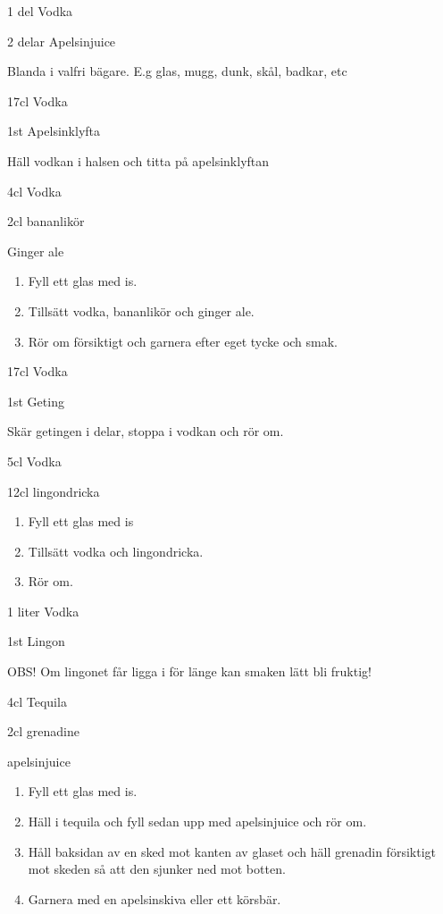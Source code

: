1 del Vodka

2 delar Apelsinjuice

Blanda i valfri bägare. E.g glas, mugg, dunk, skål, badkar, etc
\filbreak
{}

17cl Vodka

1st Apelsinklyfta

Häll vodkan i halsen och titta på apelsinklyftan
\filbreak
{}

4cl Vodka

2cl bananlikör

Ginger ale

\begin{enumerate}
    \item Fyll ett glas med is.
    \item Tillsätt vodka, bananlikör och ginger ale.
    \item Rör om försiktigt och garnera efter eget tycke och smak.
\end{enumerate}
\filbreak
{}

17cl Vodka

1st Geting

Skär getingen i delar, stoppa i vodkan och rör om.
\filbreak
{}

5cl Vodka

12cl lingondricka

\begin{enumerate}
    \item Fyll ett glas med is
    \item Tillsätt vodka och lingondricka.
    \item Rör om.
\end{enumerate}
\filbreak
{}

1 liter Vodka

1st Lingon

OBS! Om lingonet får ligga i för länge kan smaken lätt bli fruktig!
\filbreak
{}

4cl Tequila

2cl grenadine

apelsinjuice

\begin{enumerate}
    \item Fyll ett glas med is.
    \item Häll i tequila och fyll sedan upp med apelsinjuice och rör om.
    \item Håll baksidan av en sked mot kanten av glaset och häll grenadin försiktigt mot skeden så att den sjunker ned mot botten.
    \item Garnera med en apelsinskiva eller ett körsbär.
\end{enumerate}
\filbreak
{}

